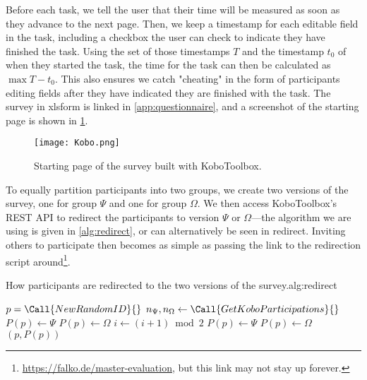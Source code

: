 \documentclass[../thesis]{subfiles}
\begin{document}
Before each task, we tell the user that their time will be measured as soon as they advance to the next page.
Then, we keep a timestamp for each editable field in the task, including a checkbox the user can check to indicate they have finished the task.
Using the set of those timestamps $T$ and the timestamp $t_0$ of when they started the task, the time for the task can then be calculated as $\max T - t_0$.
This also ensures we catch "cheating" in the form of participants editing fields after they have indicated they are finished with the task.
The survey in \gls{xlsform} is linked in \cref{app:questionnaire}, and a screenshot of the starting page is shown in \cref{fig:kobo}.

\begin{figure}
	\begin{center}
		\texttt{[image: Kobo.png]}
	\end{center}
	\caption{Starting page of the survey built with KoboToolbox.}\label{fig:kobo}
\end{figure}


To equally partition participants into two groups, we create two versions of the survey, one for group $\Psi$ and one for group $\Omega$.
We then access KoboToolbox's REST API to redirect the participants to version $\Psi$ or $\Omega$---the algorithm we are using is given in \cref{alg:redirect}, or can alternatively be seen in \gls{redirect}.
Inviting others to participate then becomes as simple as passing the link to the redirection script around\footnote{
	\url{https://falko.de/master-evaluation}, but this link may not stay up forever.
}.

\begin{talgorithm}{How participants are redirected to the two versions of the survey.}{alg:redirect}
	\begin{algorithm}[H]
		\tikzexternaldisable
		\begin{algorithmic}[1]
			\small
			\Statex
			\State $p = \Call{NewRandomID}{\null}$
			\EndIf
			\State $n_{\Psi}, n_{\Omega} \gets \Call{GetKoboParticipations}{\null}$
			\State $P(p) \gets \Psi$
			\Else
			\State $P(p) \gets \Omega$
			\EndIf
			\State $i \gets (i + 1) \bmod 2$
			\State $P(p) \gets \Psi$
			\Else
			\State $P(p) \gets \Omega$
			\EndIf
			\EndIf
			\State \Return $(p, P(p))$
		\end{algorithmic}
		\tikzexternalenable
	\end{algorithm}
\end{talgorithm}
\end{document}

